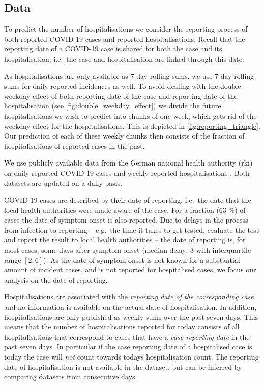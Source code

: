 \subsection{Data}
To predict the number of hospitalisations we consider the reporting
process of both reported COVID-19 cases and reported hospitalisations.
Recall that the reporting date of a COVID-19 case is shared for both the
case and its hospitalisation, i.e.~the case and hospitalisation are
linked through this date.

As hospitalisations are only available as \(7\)-day rolling sums, we use \(7\)-day rolling sums for daily
reported incidences as well. To avoid dealing with the double weekday
effect of both reporting date of the case and reporting date of the
hospitalisation (see \cref{fig:double_weekday_effect}) we divide the
future hospitalisations we wish to predict into chunks of one week,
which gets rid of the weekday effect for the hospitalisations. This is
depicted in \cref{fig:reporting_triangle}. Our prediction of each of
these weekly chunks then consists of the fraction of hospitalisations of
reported cases in the past.

We use publicly available data from the German national health authority
(\gls{rki}) on daily reported COVID-19 cases
\cite{RobertKoch-Institut2022SARSCoV2} and weekly reported
hospitalisations
\cite{RobertKoch-Institut2021COVID19Hospitalisierungen}. Both
datasets are updated on a daily basis.

COVID-19 cases are described by their date of reporting, i.e.~the date
that the local health authorities were made aware of the case. For a
fraction (63 \%) of cases the date of symptom onset is also reported.
Due to delays in the process from infection to reporting -- e.g.~the
time it takes to get tested, evaluate the test and report the result to
local health authorities -- the date of reporting is, for most cases,
some days after symptom onset (median delay: 3 with interquartile range
\([2, 6]\)). As the date of symptom onset is not known for a substantial
amount of incident cases, and is not reported for hospitalised cases, we
focus our analysis on the date of reporting.

Hospitalisations are associated with the \emph{reporting date of the
corresponding case} and no information is available on the actual date
of hospitalisation. In addition, hospitalisations are only published as
weekly sums over the past seven days. This means that the number of
hospitalisations reported for today consists of all hospitalisations
that correspond to cases that have a \emph{case reporting date} in the
past seven days. In particular if the case reporting date of a
hospitalised case is today the case will \emph{not} count towards todays
hospitalisation count. The reporting date of hospitalisation is not
available in the dataset, but can be inferred by comparing datasets from
consecutive days.

